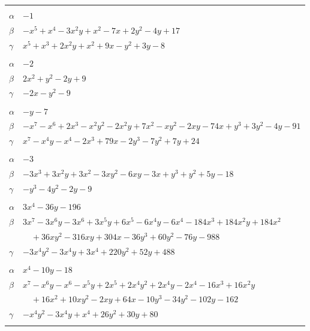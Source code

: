 \documentclass[11pt]{article}
\begin{document}
\begin{longtable}{@{}ll@{}}
\addlinespace[3pt]
\multicolumn{2}{@{}l}{$\{i,j\}=\{16,42\}$, $k_{ij}=2^{3}$}\\
$\alpha$ & $-1$\\
$\beta$ & $-x^{5}+x^{4}-3x^{2}y+x^{2}-7x+2y^{2}-4y+17$\\
$\gamma$ & $x^{5}+x^{3}+2x^{2}y+x^{2}+9x-y^{2}+3y-8$\\
\addlinespace[3pt]
\multicolumn{2}{@{}l}{$\{i,j\}=\{18,23\}$, $k_{ij}=2^{4}$}\\
$\alpha$ & $-2$\\
$\beta$ & $2x^{2}+y^{2}-2y+9$\\
$\gamma$ & $-2x-y^{2}-9$\\
\addlinespace[3pt]
\multicolumn{2}{@{}l}{$\{i,j\}=\{21,41\}$, $k_{ij}=2^{2}\cdot 3^{2}$}\\
$\alpha$ & $-y-7$\\
$\beta$ & $-x^{7}-x^{6}+2x^{3}-x^{2}y^{2}-2x^{2}y+7x^{2}-xy^{2}-2xy-74x+y^{3}+3y^{2}-4y-91$\\
$\gamma$ & $x^{7}-x^{4}y-x^{4}-2x^{3}+79x-2y^{3}-7y^{2}+7y+24$\\
\addlinespace[3pt]
\multicolumn{2}{@{}l}{$\{i,j\}=\{31,11\}$, $k_{ij}=2^{3}\cdot 3$}\\
$\alpha$ & $-3$\\
$\beta$ & $-3x^{3}+3x^{2}y+3x^{2}-3xy^{2}-6xy-3x+y^{3}+y^{2}+5y-18$\\
$\gamma$ & $-y^{3}-4y^{2}-2y-9$\\
\addlinespace[3pt]
\multicolumn{2}{@{}l}{$\{i,j\}=\{31,16\}$, $k_{ij}=2^{8}\cdot 5$}\\
$\alpha$ & $3x^{4}-36y-196$\\
$\beta$ & $3x^{7}-3x^{6}y-3x^{6}+3x^{5}y+6x^{5}-6x^{4}y-6x^{4}-184x^{3}+184x^{2}y+184x^{2}$\\
 & $\quad +36xy^{2}-316xy+304x-36y^{3}+60y^{2}-76y-988$\\
$\gamma$ & $-3x^{4}y^{2}-3x^{4}y+3x^{4}+220y^{2}+52y+488$\\
\addlinespace[3pt]
\multicolumn{2}{@{}l}{$\{i,j\}=\{31,21\}$, $k_{ij}=2^{6}$}\\
$\alpha$ & $x^{4}-10y-18$\\
$\beta$ & $x^{7}-x^{6}y-x^{6}-x^{5}y+2x^{5}+2x^{4}y^{2}+2x^{4}y-2x^{4}-16x^{3}+16x^{2}y$\\
 & $\quad +16x^{2}+10xy^{2}-2xy+64x-10y^{3}-34y^{2}-102y-162$\\
$\gamma$ & $-x^{4}y^{2}-3x^{4}y+x^{4}+26y^{2}+30y+80$\\
\addlinespace[3pt]
\multicolumn{2}{@{}l}{$\{i,j\}=\{31,36\}$, $k_{ij}=2^{4}\cdot 11$}\\

\end{longtable}
\end{document}
